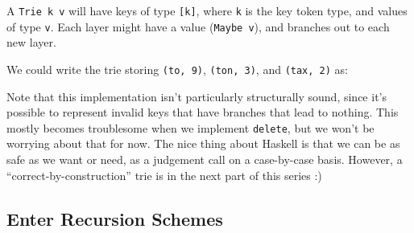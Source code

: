 \documentclass[]{article}
\newenvironment{Shaded}{}{}
\newcommand{\CharTok}[1]{\textcolor[rgb]{0.25,0.44,0.63}{#1}}
\newcommand{\CommentTok}[1]{\textcolor[rgb]{0.38,0.63,0.69}{\textit{#1}}}
\newcommand{\DataTypeTok}[1]{\textcolor[rgb]{0.56,0.13,0.00}{#1}}
\newcommand{\DecValTok}[1]{\textcolor[rgb]{0.25,0.63,0.44}{#1}}
\newcommand{\FunctionTok}[1]{\textcolor[rgb]{0.02,0.16,0.49}{#1}}
\newcommand{\NormalTok}[1]{#1}
\newcommand{\OtherTok}[1]{\textcolor[rgb]{0.00,0.44,0.13}{#1}}
\begin{document}
A \texttt{Trie\ k\ v} will have keys of type \texttt{{[}k{]}}, where \texttt{k}
is the key token type, and values of type \texttt{v}. Each layer might have a
value (\texttt{Maybe\ v}), and branches out to each new layer.

We could write the trie storing \texttt{(to,\ 9)}, \texttt{(ton,\ 3)}, and
\texttt{(tax,\ 2)} as:

\begin{Shaded}
\end{Shaded}

Note that this implementation isn't particularly structurally sound, since it's
possible to represent invalid keys that have branches that lead to nothing. This
mostly becomes troublesome when we implement \texttt{delete}, but we won't be
worrying about that for now. The nice thing about Haskell is that we can be as
safe as we want or need, as a judgement call on a case-by-case basis. However, a
``correct-by-construction'' trie is in the next part of this series :)

\hypertarget{enter-recursion-schemes}{%
\subsection{Enter Recursion Schemes}\label{enter-recursion-schemes}}
\end{document}
